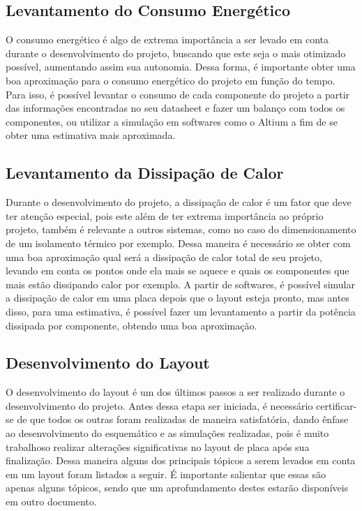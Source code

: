 \subsection{Levantamento do Consumo Energético}

O consumo energético é algo de extrema importância a ser levado em conta durante o desenvolvimento do  projeto, buscando que este seja o mais otimizado possível, aumentando assim sua autonomia. Dessa forma, é importante obter uma boa aproximação para o consumo energético do projeto em função do tempo. Para isso, é possível levantar o consumo de cada componente do projeto a partir das informações encontradas no seu datasheet e fazer um balanço com todos os componentes, ou utilizar a simulação em softwares como o Altium a fim de se obter uma estimativa mais aproximada. 

\subsection{Levantamento da Dissipação de Calor}

Durante o desenvolvimento do projeto, a dissipação de calor é um fator que deve ter atenção especial, pois este além de ter extrema importância ao próprio projeto, também é relevante a outros sistemas, como no caso do dimensionamento de um isolamento térmico por exemplo.  Dessa maneira é necessário se obter com uma boa aproximação qual será a dissipação de calor total de seu projeto, levando em conta os pontos onde ela mais se aquece e  quais os componentes que mais estão dissipando calor por exemplo. A partir de softwares, é possível simular a dissipação de calor em uma placa depois que o layout esteja pronto, mas antes disso, para uma estimativa, é possível fazer um levantamento a partir da potência dissipada por componente, obtendo uma boa aproximação.

\subsection{Desenvolvimento do Layout}


O desenvolvimento do layout é um dos últimos passos a ser realizado durante o desenvolvimento do projeto. Antes dessa etapa ser iniciada, é necessário certificar-se de que todos os outras foram realizadas de maneira satisfatória, dando ênfase ao desenvolvimento do esquemático e as simulações realizadas, pois é muito trabalhoso realizar alterações significativas no layout de placa após sua finalização. Dessa maneira alguns dos principais tópicos a serem levados em conta em um layout foram listados a seguir. É importante salientar que essas são apenas alguns tópicos, sendo que um aprofundamento destes estarão disponíveis em outro documento.

